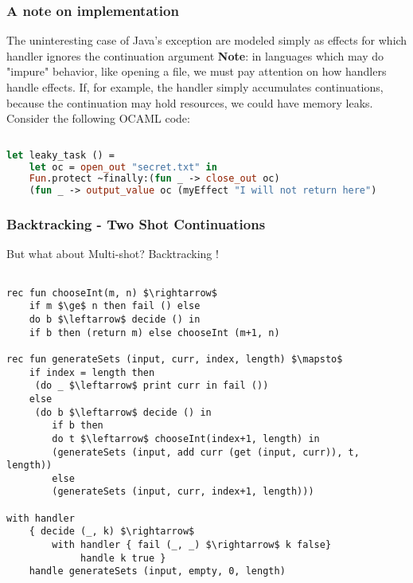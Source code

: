 \documentclass[t]{beamer}
\begin{document}
\begin{frame}[fragile]
	\frametitle{A note on implementation}
	The uninteresting case of Java's exception are modeled simply as effects for which handler ignores the continuation argument
	\newline
	\newline
	\textbf{Note}: in languages which may do "impure" behavior, like opening a file, we must pay attention on how handlers handle effects. 
	If, for example, the handler simply accumulates continuations, because the continuation may hold resources, we could have memory leaks. 
	\newline
	Consider the following OCAML code:
	\begin{lstlisting}[language=ocaml, basicstyle=\scriptsize\ttfamily, breaklines=true, xleftmargin=0em, lineskip=-1pt, aboveskip=0pt, belowskip=0pt, moredelim={[is][\color{red}]{STARTRC}{ENDRC}}]
		
let leaky_task () =
	let oc = open_out "secret.txt" in
	Fun.protect ~finally:(fun _ -> close_out oc) 
	(fun _ -> output_value oc (myEffect "I will not return here")
	\end{lstlisting}
	
\end{frame}

\begin{frame}[fragile]
	\frametitle{Backtracking - Two Shot Continuations}
	
	But \alert{what about Multi-shot}?
	Backtracking !
	\begin{lstlisting}[language=pratner, mathescape=true, basicstyle=\scriptsize,lineskip=-2pt, aboveskip=0pt, belowskip=0pt, columns=fullflexible]

rec fun chooseInt(m, n) $\rightarrow$
	if m $\ge$ n then fail () else 
	do b $\leftarrow$ decide () in
	if b then (return m) else chooseInt (m+1, n)

rec fun generateSets (input, curr, index, length) $\mapsto$ 
	if index = length then
	 (do _ $\leftarrow$ print curr in fail ())
	else 
	 (do b $\leftarrow$ decide () in
		if b then  
		do t $\leftarrow$ chooseInt(index+1, length) in
		(generateSets (input, add curr (get (input, curr)), t, length))
		else 
		(generateSets (input, curr, index+1, length)))
		
with handler 
	{ decide (_, k) $\rightarrow$ 
		with handler { fail (_, _) $\rightarrow$ k false}
			 handle k true } 
	handle generateSets (input, empty, 0, length)
	\end{lstlisting}
\end{frame}
\end{document}
